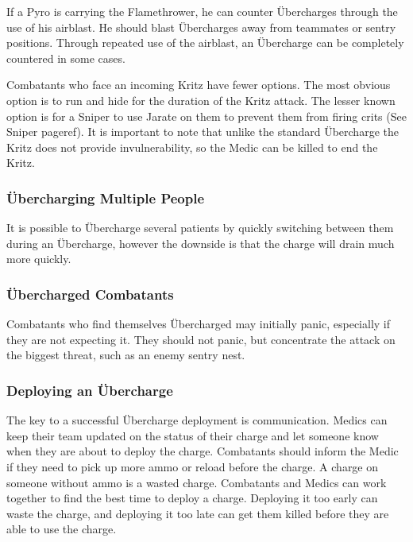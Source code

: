 If a Pyro is carrying the Flamethrower, he can counter Übercharges through the use of his airblast.  He should blast Übercharges away from teammates or sentry positions.  Through repeated use of the airblast, an Übercharge can be completely countered in some cases.

Combatants who face an incoming Kritz have fewer options. The most obvious option is to run and hide for the duration of the Kritz attack. The lesser known option is for a Sniper to use Jarate on them to prevent them from firing crits (See Sniper {{pageref}}).  It is important to note that unlike the standard Übercharge the Kritz does not provide invulnerability, so the Medic can be killed to end the Kritz.

\subsubsection{Übercharging Multiple People}
It is possible to Übercharge several patients by quickly switching between them during an Übercharge, however the downside is that the charge will drain much more quickly.

\subsubsection{Übercharged Combatants}
Combatants who find themselves Übercharged may initially panic, especially if they are not expecting it.  They should not panic, but concentrate the attack on the biggest threat, such as an enemy sentry nest.

\subsubsection{Deploying an Übercharge}
The key to a successful Übercharge deployment is communication.  Medics can keep their team updated on the status of their charge and let someone know when they are about to deploy the charge.  Combatants should inform the Medic if they need to pick up more ammo or reload before the charge.  A charge on someone without ammo is a wasted charge.  Combatants and Medics can work together to find the best time to deploy a charge.  Deploying it too early can waste the charge, and deploying it too late can get them killed before they are able to use the charge. 